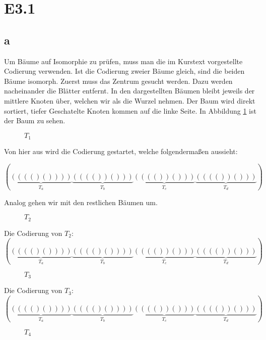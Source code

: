 \documentclass[12pt]{article}
\begin{document}
\section*{E3.1}
\subsection*{a}
Um Bäume auf Isomorphie zu prüfen, muss man die im Kurstext vorgestellte Codierung verwenden. Ist die Codierung
zweier Bäume gleich, sind die beiden Bäume isomorph. Zuerst muss das Zentrum gesucht werden. Dazu werden nacheinander die Blätter entfernt.
In den dargestellten Bäumen bleibt jeweils der mittlere Knoten über, welchen wir als die Wurzel nehmen. Der Baum wird direkt sortiert,
tiefer Geschatelte Knoten kommen auf die linke Seite. In Abbildung \ref{img:baum1} ist der Baum zu sehen.
 

\begin{figure}[h]
	\centering
	\scalebox{.5}{}
	\caption{$T_1$} 
	\label{img:baum1}
\end{figure}


Von hier aus wird die Codierung gestartet, welche folgendermaßen aussieht:

$$
( \underbrace{ (((()())))}_{T_a}  \underbrace{ (((()) ())) }_{T_b}   \underbrace{ (((()) ())) }_{T_c} \underbrace{ (( (()) () )) }_{ T_d  }    )
$$


Analog gehen wir mit den restlichen Bäumen um.

\begin{figure}[h]
	\centering
	\scalebox{.5}{}
	\caption{$T_2$} 
	\label{img:baum2}
\end{figure} 

Die Codierung von $T_2$:
$$
(    \underbrace{(((()())))}_{T_a} \underbrace{(((()())))}_{T_b}  \underbrace{(((())()))}_{T_c}    \underbrace{(((())()))}_{T_d}                   )
$$

\newpage

\begin{figure}[h]
	\centering
	\scalebox{.5}{}
	\caption{$T_3$} 
	\label{img:baum3}
\end{figure} 

Die Codierung von $T_3$:
$$
(    \underbrace{(((()())))}_{T_a} \underbrace{(((()())))}_{T_b}  \underbrace{(((())()))}_{T_c}    \underbrace{(((())()))}_{T_d}                   )
$$



\begin{figure}[h]
	\centering
	\scalebox{.5}{}
	\caption{$T_4$} 
	\label{img:baum4}
\end{figure}
\end{document}
